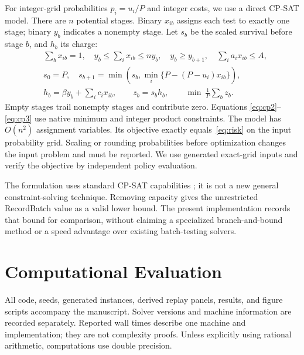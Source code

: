 \documentclass[runningheads]{llncs}
\begin{document}
For integer-grid probabilities $p_i=u_i/P$ and integer costs, we use a
direct CP-SAT model. There are $n$ potential stages. Binary $x_{ib}$
assigns each test to exactly one stage; binary $y_b$ indicates a nonempty
stage. Let $s_b$ be the scaled survival before stage $b$, and $h_b$ its charge:
\begin{align}
&\sum_b x_{ib}=1,\quad
y_b\leq\sum_i x_{ib}\leq n y_b,\quad y_b\geq y_{b+1},
\quad \sum_i a_i x_{ib}\leq A,\label{eq:cp1}\\
&s_0=P,\quad
s_{b+1}=\min\left(s_b,\min_i\{P-(P-u_i)x_{ib}\}\right),\label{eq:cp2}\\
&h_b=\beta y_b+\sum_i c_i x_{ib},\qquad
z_b=s_b h_b,\qquad
\min\ \frac1P\sum_b z_b.\label{eq:cp3}
\end{align}
Empty stages trail nonempty stages and contribute zero. Equations
\eqref{eq:cp2}--\eqref{eq:cp3} use native minimum and integer product
constraints. The model has $O(n^2)$ assignment variables. Its objective
exactly equals~\eqref{eq:risk} on the input probability grid. Scaling or
rounding probabilities before optimization changes the input problem and
must be reported. We use generated exact-grid inputs and verify the objective
by independent policy evaluation.

The formulation uses standard CP-SAT capabilities \cite{perron2023}; it is
not a new general constraint-solving technique. Removing capacity gives
the unrestricted RecordBatch value as a valid lower bound. The present
implementation records that bound for comparison, without claiming a
specialized branch-and-bound method or a speed advantage over existing
batch-testing solvers.

\section{Computational Evaluation}
All code, seeds, generated instances, derived replay panels, results, and
figure scripts accompany the manuscript. Solver versions and machine
information are recorded separately. Reported wall times describe one
machine and implementation; they are not complexity proofs. Unless explicitly
using rational arithmetic, computations use double precision.
\end{document}
